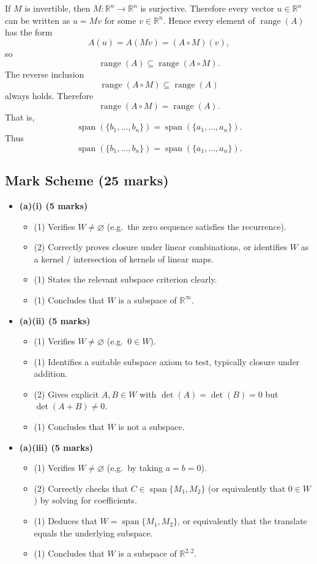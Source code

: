 \documentclass[12pt]{article}
\newcommand{\R}{\mathbb{R}}
\DeclareMathOperator{\Range}{range}
\newcommand{\Span}{\operatorname{span}}
\begin{document}
If \(M\) is invertible, then \(M:\R^n\to\R^n\) is surjective. Therefore every vector \(u\in\R^n\) can be written as \(u=Mv\) for some \(v\in\R^n\). Hence every element of \(\Range(A)\) has the form
\[
A(u)=A(Mv)=(A\circ M)(v),
\]
so
\[
\Range(A)\subseteq \Range(A\circ M).
\]
The reverse inclusion
\[
\Range(A\circ M)\subseteq \Range(A)
\]
always holds. Therefore
\[
\Range(A\circ M)=\Range(A).
\]
That is,
\[
\Span(\{b_1,\ldots,b_n\})=\Span(\{a_1,\ldots,a_n\}).
\]
Thus
\[
\boxed{\Span(\{b_1,\ldots,b_n\})=\Span(\{a_1,\ldots,a_n\}).}
\]

\newpage

\subsection{Mark Scheme (25 marks)}
\begin{itemize}[leftmargin=1.6em]
  \item \textbf{(a)(i) (5 marks)}
  \begin{itemize}[leftmargin=1.6em]
    \item (1) Verifies \(W\neq\varnothing\) (e.g.\ the zero sequence satisfies the recurrence).
    \item (2) Correctly proves closure under linear combinations, or identifies \(W\) as a kernel / intersection of kernels of linear maps.
    \item (1) States the relevant subspace criterion clearly.
    \item (1) Concludes that \(W\) is a subspace of \(\R^\infty\).
  \end{itemize}

  \item \textbf{(a)(ii) (5 marks)}
  \begin{itemize}[leftmargin=1.6em]
    \item (1) Verifies \(W\neq\varnothing\) (e.g.\ \(0\in W\)).
    \item (1) Identifies a suitable subspace axiom to test, typically closure under addition.
    \item (2) Gives explicit \(A,B\in W\) with \(\det(A)=\det(B)=0\) but \(\det(A+B)\neq 0\).
    \item (1) Concludes that \(W\) is not a subspace.
  \end{itemize}

  \item \textbf{(a)(iii) (5 marks)}
  \begin{itemize}[leftmargin=1.6em]
    \item (1) Verifies \(W\neq\varnothing\) (e.g.\ by taking \(a=b=0\)).
    \item (2) Correctly checks that \(C\in \Span\{M_1,M_2\}\) (or equivalently that \(0\in W\)) by solving for coefficients.
    \item (1) Deduces that \(W=\Span\{M_1,M_2\}\), or equivalently that the translate equals the underlying subspace.
    \item (1) Concludes that \(W\) is a subspace of \(\R^{2,2}\).
  \end{itemize}


\end{itemize}
\end{document}
